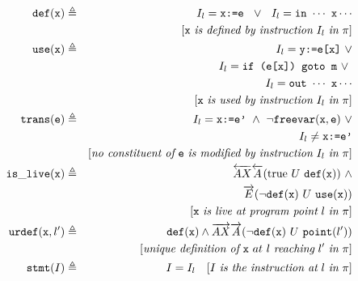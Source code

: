 \begin{figure}[hb]
\vspace{-3mm}
\begin{small}
\begin{eqnarray*}
\wdef(\wx) & \triangleq & I_l= \texttt{x:=e} ~~ \vee ~~ I_l= \texttt{in} ~ \cdots ~ \texttt{x} \cdots \\
                            &            & [\wx ~ \textit{is defined by instruction} ~ I_l ~ \textit{in} ~ \pi] \\
\wuse(\wx) & \triangleq & I_l= \texttt{y:=e[x]} ~ \vee  \\
                            &            & I_l= \texttt{if (e[x]) goto m} ~ \vee \ \\
                            &            & I_l= \texttt{out} ~ \cdots ~ \texttt{x} \cdots \\
                            &            & [\wx ~ \textit{is used by instruction} ~ I_l ~ \textit{in} ~ \pi] \\
\wtrans(\we) & \triangleq & I_l= \texttt{x:=e'} ~ \wedge ~ \neg\wfreevar(\wx,\we) ~ \vee \\
                            &            & I_l\neq\texttt{x:=e'} \\
                            &            & [\textit{no constituent of}~\we~\textit{is modified by instruction} ~ I_l ~ \textit{in} ~ \pi] \\
\live(\wx) & \triangleq & \overleftarrow{AX}\overleftarrow{A}(\text{true} ~ U ~ \wdef(\wx)) ~ \wedge \\
                            &            & \overrightarrow{E}(\neg\wdef(\wx) ~ U ~ \wuse(\wx)) \\
                            &            & [\wx ~ \textit{is live at program point} ~ l ~ \textit{in} ~ \pi] \\
\ureachdef(\wx,l') & \triangleq & \wdef(\wx)\wedge\overrightarrow{AX}\overrightarrow{A}(\neg\wdef(\wx) ~ U ~ \point(l')) \\
                            &            & [\textit{unique definition of}~\wx~{at}~l~\textit{reaching}~l'~\textit{in} ~ \pi] \\
\stmt(I) & \triangleq & I=I_l ~~~ [I ~ \textit{is the instruction at} ~ l ~ \textit{in} ~ \pi]\\

\end{eqnarray*}
\end{small}
\end{figure}
